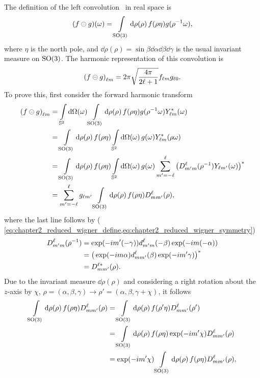 The definition of the left convolution~\autocite{Kennedy2011,Driscoll1994} in real space is
%
\begin{equation}
	\pixel{(f \circleddash g)}
	= \integrateRotation{\rho} f(\rho\eta) g(\rho^{-1}\omega),
\end{equation}
%
where \({\eta}\) is the north pole, and \(\dd{\rho(\rho)}=\sin{\beta} \dd{\alpha} \dd{\beta} \dd{\gamma}\) is the usual invariant measure on \(\rotationGroup{}\).
The harmonic representation of this convolution is
%
\begin{equation}
	\harmonic{(f \circleddash g)}
	= 2\pi \sqrt{\inverseFactor} \harmonic{f} \axiHarmonic{g}.
\end{equation}
%
To prove this, first consider the forward harmonic transform
%
\begin{align}
	\harmonic{(f \circleddash g)}
	 & = \integrateSphere{\omega} \integrateRotation{\rho} f(\rho\eta) g(\rho^{-1}\omega) \pixel{\conj{\harmonic{Y}}} \nonumber{}                                                                 \\
	 & = \integrateRotation{\rho} f(\rho\eta) \integrateSphere{\omega} \pixel{g} \conj{\harmonic{Y}}(\rho\omega) \nonumber{}                                                                      \\
	 & = \integrateRotation{\rho} f(\rho\eta) \integrateSphere{\omega} \pixel{g} \sum\limits_{m'=-\ell}^{\ell} \conj{\big( \wigner{\ell}{m'}{m}(\rho^{-1}) \pixel{Y_{\ell m'}} \big)} \nonumber{} \\
	 & = \sum\limits_{m'=-\ell}^{\ell} g_{\ell m'} \integrateRotation{\rho} f(\rho\eta) \wigner{\ell}{m}{m'}(\rho),
\end{align}
%
where the last line follows by (\cf{} \cref{eq:chapter2_reduced_wigner_define,eq:chapter2_reduced_wigner_symmetry})
%
\begin{align}
	\wigner{\ell}{m'}{m} (\rho^{-1})
	 & = \exp(-i m'(-\gamma)) \reducedWigner{\ell}{m'}{m}(-\beta) \exp(-i m(-\alpha)) \nonumber{}           \\
	 & = \conj{\big(\exp(-i m\alpha) \reducedWigner{\ell}{m}{m'}(\beta) \exp(-i m'\gamma)\big)} \nonumber{} \\
	 & = \wigner[\ast]{\ell}{m}{m'}(\rho).
\end{align}
%
Due to the invariant measure \(\dd{\rho(\rho)}\) and considering a right rotation about the \(z\)-axis by \({\chi}\), \ie{} \(\rho = (\alpha,\beta,\gamma) \rightarrow \rho' = (\alpha,\beta,\gamma+\chi)\), it follows
%
\begin{align}\label{eq:chapter2_so3_integral}
	\integrateRotation{\rho} f(\rho\eta) \wigner{\ell}{m}{m'}(\rho)
	 & = \integrateRotation{\rho} f(\rho'\eta) \wigner{\ell}{m}{m'}(\rho') \nonumber{}               \\
	 & = \integrateRotation{\rho} f(\rho\eta) \exp(-i m'\chi) \wigner{\ell}{m}{m'}(\rho) \nonumber{} \\
	 & = \exp(-i m'\chi) \integrateRotation{\rho} f(\rho\eta) \wigner{\ell}{m}{m'}(\rho),
\end{align}
